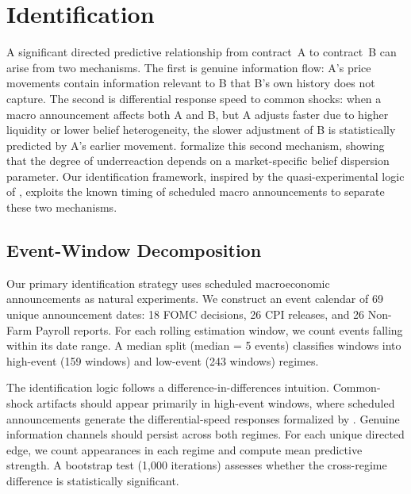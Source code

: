 \documentclass[12pt,letterpaper]{article}
\begin{document}

\section{Identification}\label{sec:identification}

A significant directed predictive relationship from contract~A to contract~B can arise from two mechanisms. The first is genuine information flow: A's price movements contain information relevant to B that B's own history does not capture. The second is differential response speed to common shocks: when a macro announcement affects both A and B, but A adjusts faster due to higher liquidity or lower belief heterogeneity, the slower adjustment of B is statistically predicted by A's earlier movement. \citet{ottaviani2015price} formalize this second mechanism, showing that the degree of underreaction depends on a market-specific belief dispersion parameter. Our identification framework, inspired by the quasi-experimental logic of \citet{angrist2014mastering}, exploits the known timing of scheduled macro announcements to separate these two mechanisms.

\subsection{Event-Window Decomposition}

Our primary identification strategy uses scheduled macroeconomic announcements as natural experiments. We construct an event calendar of 69 unique announcement dates: 18 FOMC decisions, 26 CPI releases, and 26 Non-Farm Payroll reports. For each rolling estimation window, we count events falling within its date range. A median split (median = 5 events) classifies windows into high-event (159 windows) and low-event (243 windows) regimes.

The identification logic follows a difference-in-differences intuition. Common-shock artifacts should appear primarily in high-event windows, where scheduled announcements generate the differential-speed responses formalized by \citet{ottaviani2015price}. Genuine information channels should persist across both regimes. For each unique directed edge, we count appearances in each regime and compute mean predictive strength. A bootstrap test (1,000 iterations) assesses whether the cross-regime difference is statistically significant.
\end{document}
